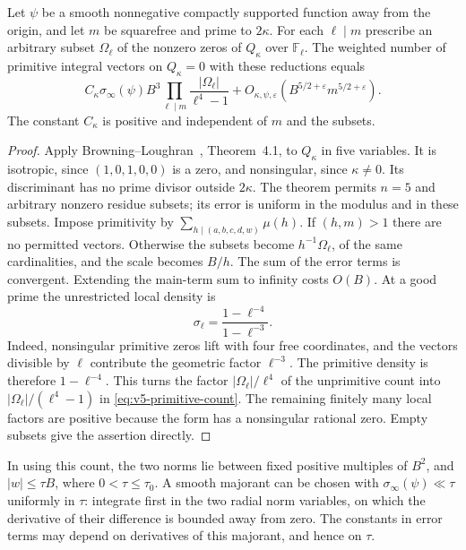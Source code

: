 \begin{lemma}\label{lem:v5-primitive-count}
Let $\psi$ be a smooth nonnegative compactly supported function away from
the origin, and let $m$ be squarefree and prime to $2\kappa$.
For each $\ell\mid m$ prescribe an arbitrary subset $\Omega_\ell$ of the
nonzero zeros of $Q_\kappa$ over $\mathbb F_\ell$. The weighted number of
primitive integral vectors on $Q_\kappa=0$ with these reductions equals
\begin{equation}\label{eq:v5-primitive-count}
 C_\kappa\sigma_\infty(\psi)B^3
 \prod_{\ell\mid m}\frac{|\Omega_\ell|}{\ell^4-1}
 +O_{\kappa,\psi,\varepsilon}
       (B^{5/2+\varepsilon}m^{5/2+\varepsilon}).
\end{equation}
The constant $C_\kappa$ is positive and independent of $m$ and the subsets.
\end{lemma}
\begin{proof}
Apply Browning--Loughran~\cite{v5bl}, Theorem~4.1, to $Q_\kappa$ in five
variables. It is isotropic, since $(1,0,1,0,0)$ is a zero, and nonsingular,
since $\kappa\ne0$. Its discriminant has no prime divisor outside
$2\kappa$. The theorem permits $n=5$ and arbitrary nonzero residue subsets;
its error is uniform in the modulus and in these subsets.
Impose primitivity by $\sum_{h\mid(a,b,c,d,w)}\mu(h)$.
If $(h,m)>1$ there are no permitted vectors. Otherwise the subsets become
$h^{-1}\Omega_\ell$, of the same cardinalities, and the scale becomes $B/h$.
The sum of the error terms is convergent. Extending the main-term sum to
infinity costs $O(B)$.
At a good prime the unrestricted local density is
\[
 \sigma_\ell=\frac{1-\ell^{-4}}{1-\ell^{-3}}.
\]
Indeed, nonsingular primitive zeros lift with four free coordinates, and
the vectors divisible by $\ell$ contribute the geometric factor
$\ell^{-3}$. The primitive density is therefore $1-\ell^{-4}$.
This turns the factor $|\Omega_\ell|/\ell^4$ of the unprimitive count into
$|\Omega_\ell|/(\ell^4-1)$ in \eqref{eq:v5-primitive-count}.
The remaining finitely many local factors are positive because the form
has a nonsingular rational zero. Empty subsets give the assertion directly.
\end{proof}

In using this count, the two norms lie between fixed positive multiples of
$B^2$, and $|w|\leq\tau B$, where $0<\tau\leq\tau_0$.
A smooth majorant can be chosen with
$\sigma_\infty(\psi)\ll\tau$ uniformly in $\tau$: integrate first in the
two radial norm variables, on which the derivative of their difference is
bounded away from zero. The constants in error terms may depend on
derivatives of this majorant, and hence on $\tau$.

